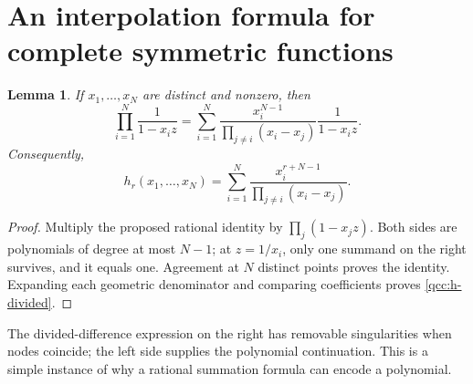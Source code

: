 \documentclass[11pt,a4paper,oneside,openany]{book}
\newtheorem{lemma}[theorem]{Lemma}
\theoremstyle{definition}
\theoremstyle{remark}
\begin{document}
\section{An interpolation formula for complete symmetric functions}
\begin{lemma}\label{qcc:partial-fraction}
If \(x_1,\ldots,x_N\) are distinct and nonzero, then
\begin{equation}\label{qcc:partial-fraction-formula}
 \prod_{i=1}^N\frac1{1-x_i z}
 =\sum_{i=1}^N\frac{x_i^{N-1}}{\prod_{j\ne i}(x_i-x_j)}\frac1{1-x_i z}.
\end{equation}
Consequently,
\begin{equation}\label{qcc:h-divided}
 h_r(x_1,\ldots,x_N)
 =\sum_{i=1}^N\frac{x_i^{r+N-1}}{\prod_{j\ne i}(x_i-x_j)}.
\end{equation}
\end{lemma}
\begin{proof}
Multiply the proposed rational identity by \(\prod_j(1-x_jz)\).
Both sides are polynomials of degree at most \(N-1\); at \(z=1/x_i\), only
one summand on the right survives, and it equals one. Agreement at \(N\)
distinct points proves the identity. Expanding each geometric denominator and
comparing coefficients proves \eqref{qcc:h-divided}.
\end{proof}
The divided-difference expression on the right has removable singularities when
nodes coincide; the left side supplies the polynomial continuation. This is a
simple instance of why a rational summation formula can encode a polynomial.
\end{document}
